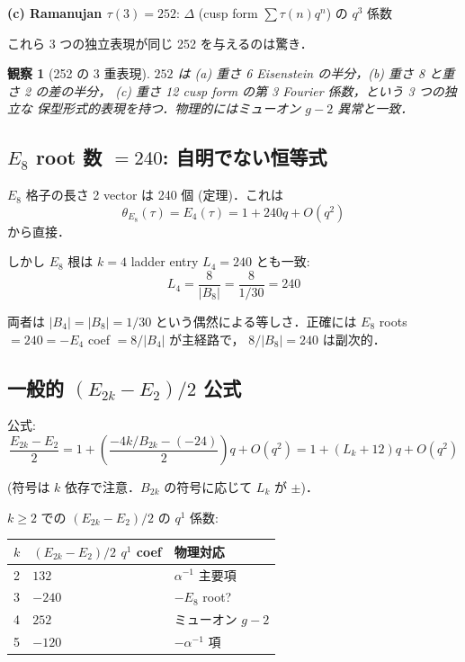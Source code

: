 \documentclass[11pt,a4paper]{article}
\newtheorem{observation}{観察}
\begin{document}
\textbf{(c) Ramanujan $\tau(3) = 252$}: $\Delta$ (cusp form $\sum \tau(n) q^n$)
の $q^3$ 係数

これら 3 つの独立表現が同じ 252 を与えるのは驚き．

\begin{observation}[252 の 3 重表現]
$252$ は (a) 重さ 6 Eisenstein の半分，(b) 重さ 8 と重さ 2 の差の半分，
(c) 重さ 12 cusp form の第 3 Fourier 係数，という 3 つの独立な
保型形式的表現を持つ．物理的にはミューオン $g-2$ 異常と一致．
\end{observation}

\subsection{$E_8$ root 数 $= 240$: 自明でない恒等式}

$E_8$ 格子の長さ 2 vector は 240 個 (定理)．これは
\begin{equation}
\theta_{E_8}(\tau) = E_4(\tau) = 1 + 240 q + O(q^2)
\end{equation}
から直接．

しかし $E_8$ 根は $k=4$ ladder entry $L_4 = 240$ とも一致:
\begin{equation}
L_4 = \frac{8}{|B_8|} = \frac{8}{1/30} = 240
\end{equation}

両者は $|B_4| = |B_8| = 1/30$ という偶然による等しさ．正確には
$E_8$ roots $= 240 = -E_4$ coef $= 8/|B_4|$ が主経路で，
$8/|B_8| = 240$ は副次的．

\subsection{一般的 $(E_{2k} - E_2)/2$ 公式}

公式:
\begin{equation}
\frac{E_{2k} - E_2}{2} = 1 + \left(\frac{-4k/B_{2k} - (-24)}{2}\right) q + O(q^2)
= 1 + \left(L_k + 12\right) q + O(q^2)
\end{equation}

(符号は $k$ 依存で注意．$B_{2k}$ の符号に応じて $L_k$ が $\pm$)．

$k \geq 2$ での $(E_{2k} - E_2)/2$ の $q^1$ 係数:

\begin{center}
\begin{tabular}{lll}
\toprule
$k$ & $(E_{2k} - E_2)/2$ $q^1$ coef & 物理対応 \\
\midrule
2 & $132$ & $\alpha^{-1}$ 主要項 \\
3 & $-240$ & $-E_8$ root? \\
4 & $252$ & ミューオン $g-2$ \\
5 & $-120$ & $-\alpha^{-1}$ 項 \\
\bottomrule
\end{tabular}
\end{center}
\end{document}
